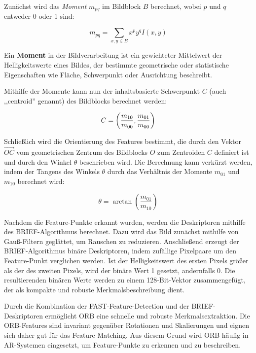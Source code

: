 Zunächst wird das \emph{Moment} \( m_{pq} \) im Bildblock \( B \) berechnet, wobei \( p \) und \( q \) entweder 0 oder 1 sind:

\begin{equation}
    m_{pq} = \sum_{x,y \in B} x^p y^q I(x, y)
\end{equation}

\begin{tcolorbox}[colback=THAi-Blue!20!white, colframe=THAi-Blue]
    Ein \textbf{Moment} in der Bildverarbeitung ist ein gewichteter Mittelwert der Helligkeitswerte eines Bildes, der bestimmte geometrische oder statistische Eigenschaften wie Fläche, Schwerpunkt oder Ausrichtung beschreibt. \cite{wikipedia2024moment}
\end{tcolorbox}

Mithilfe der Momente kann nun der inhaltsbasierte Schwerpunkt \( C \) (auch ,,centroid'' genannt) des Bildblocks berechnet werden:

\begin{equation}
C = 
\left(
\frac{m_{10}}{m_{00}}, \\
\frac{m_{01}}{m_{00}}
\right)
\end{equation}

Schließlich wird die Orientierung des Features bestimmt, die durch den Vektor \( \overrightarrow{OC} \) vom geometrischen Zentrum des Bildblocks \( O \) zum Zentroiden \( C \) definiert ist und durch den Winkel \( \theta \) beschrieben wird. Die Berechnung kann verkürzt werden, indem der Tangens des Winkels \( \theta \) durch das Verhältnis der Momente \( m_{01} \) und \( m_{10} \) berechnet wird:

\begin{equation}
    \theta = \arctan \left( \frac{m_{01}}{m_{10}} \right)
\end{equation}

Nachdem die Feature-Punkte erkannt wurden, werden die Deskriptoren mithilfe des BRIEF-Algorithmus berechnet. Dazu wird das Bild zunächst mithilfe von Gauß-Filtern geglättet, um Rauschen zu reduzieren. Anschließend erzeugt der BRIEF-Algorithmus binäre Deskriptoren, indem zufällige Pixelpaare um den Feature-Punkt verglichen werden. Ist der Helligkeitswert des ersten Pixels größer als der des zweiten Pixels, wird der binäre Wert 1 gesetzt, andernfalls 0. Die resultierenden binären Werte werden zu einem 128-Bit-Vektor zusammengefügt, der als kompakte und robuste Merkmalsbeschreibung dient. \cite{gao2021vSLAM, calonder2010brief}

Durch die Kombination der FAST-Feature-Detection und der BRIEF-Deskriptoren ermöglicht ORB eine schnelle und robuste Merkmalsextraktion. Die ORB-Features sind invariant gegenüber Rotationen und Skalierungen und eignen sich daher gut für das Feature-Matching. Aus diesem Grund wird ORB häufig in AR-Systemen eingesetzt, um Feature-Punkte zu erkennen und zu beschreiben. \cite{gao2021vSLAM, rublee2011orb}


